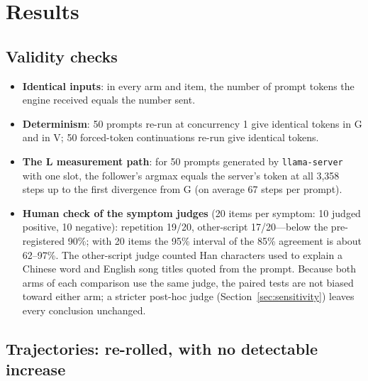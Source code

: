 \documentclass[11pt]{article}
\begin{document}
\section{Results}\label{sec:results}

\subsection{Validity checks}\label{sec:validity}

\begin{itemize}
\item \textbf{Identical inputs}: in every arm and item, the number of prompt tokens the engine received equals the number
      sent.
\item \textbf{Determinism}: 50 prompts re-run at concurrency 1 give identical tokens in G and in V; 50 forced-token
      continuations re-run give identical tokens.
\item \textbf{The L measurement path}: for 50 prompts generated by \texttt{llama-server} with one slot, the follower's argmax
      equals the server's token at all 3,358 steps up to the first divergence from G (on average 67 steps per prompt).
\item \textbf{Human check of the symptom judges} (20 items per symptom: 10 judged positive, 10 negative): repetition 19/20,
      other-script 17/20---below the pre-registered 90\%; with 20 items the 95\% interval of the 85\% agreement is about
      62--97\%. The other-script judge counted Han characters used to explain a Chinese word and English song titles quoted
      from the prompt. Because both arms of each comparison use the same judge, the paired tests are not biased toward
      either arm; a stricter post-hoc judge (Section~\ref{sec:sensitivity}) leaves every conclusion unchanged.
\end{itemize}

\subsection{Trajectories: re-rolled, with no detectable increase}\label{sec:trajectories}
\end{document}
